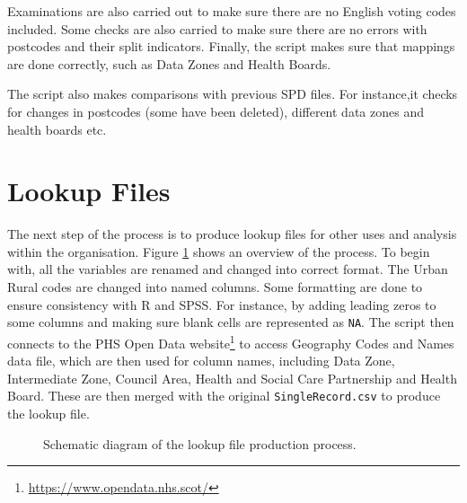 \documentclass[12pt]{article}
\newcommand{\R}{{\sc R}\xspace}
\newcommand{\spss}{{\sc SPSS}\xspace}
\begin{document}
Examinations are also
carried out to make sure there are no English voting codes included. Some checks are also carried to make sure
there are no errors with postcodes and their
split indicators.
Finally, the script makes sure that mappings are done correctly,
such as Data Zones and Health Boards.

The script also makes comparisons with previous SPD files.
For instance,it checks for changes in postcodes
(some have been deleted), different data zones and
health boards etc.

 
\section{Lookup Files}
The next step of the process is to produce lookup files for
other uses and analysis within the organisation. Figure \ref{fig:block2} shows an overview of the process. To begin
with, all the variables are renamed and changed into
correct format. The Urban Rural codes are changed into
named columns. Some formatting are done to ensure
consistency with \R and \spss. For instance, by adding
leading zeros to some columns and making sure
blank cells are represented as \texttt{NA}. The script
then connects to the PHS Open Data website\footnote{\url{https://www.opendata.nhs.scot/}}   
to access Geography Codes and Names data file,
which are then used for column names, including
Data Zone, Intermediate Zone, Council Area,
Health and Social Care Partnership and Health Board.
These are then merged with the original
\texttt{SingleRecord.csv} to produce the lookup file.

\begin{figure}[h!]
{}
\caption{Schematic diagram of the lookup file production process.}\label{fig:block2}
\end{figure}
\end{document}
